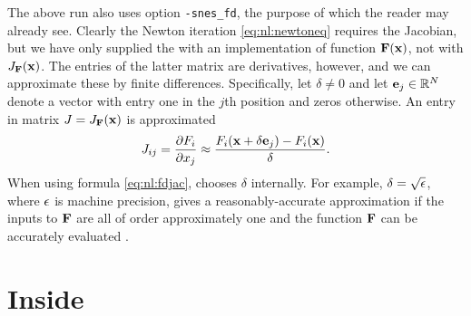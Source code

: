 The above run also uses option \texttt{-snes\_fd}, the purpose of which the reader may already see.  Clearly the Newton iteration \eqref{eq:nl:newtoneq} requires the Jacobian, but we have only supplied the \pSNES with an implementation of function $\mathbf{F}(\mathbf{x})$, not with $J_{\mathbf{F}}(\mathbf{x})$.  The entries of the latter matrix are derivatives, however, and we can approximate these by finite differences.  Specifically, let $\delta\ne 0$ and let $\mathbf{e}_j\in \mathbb{R}^N$ denote a vector with entry one in the $j$th position and zeros otherwise.  An entry in matrix $J=J_{\mathbf{F}}(\mathbf{x})$ is approximated
\begin{equation}
J_{ij} = \frac{\partial F_i}{\partial x_j} \approx \frac{F_i(\mathbf{x}+\delta \mathbf{e}_j) - F_i(\mathbf{x})}{\delta}.  \label{eq:nl:fdjac}
\end{equation}
When using formula \eqref{eq:nl:fdjac}, \PETSc chooses $\delta$ internally.  For example, $\delta = \sqrt{\epsilon}$, where $\epsilon$ is machine precision, gives a reasonably-accurate approximation if the inputs to $\mathbf{F}$ are all of order approximately one and the function $\mathbf{F}$ can be accurately evaluated \citep{Kelley2003}.


\section{Inside \pSNES} \label{sec:insidesnes}

